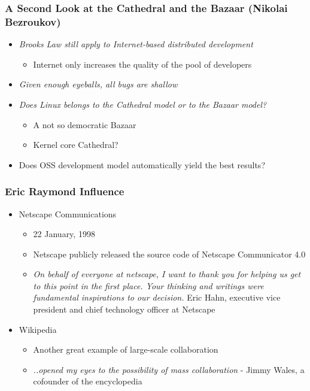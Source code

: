 \documentclass{beamer}
\begin{document}
\begin{frame}
\frametitle{A Second Look at the Cathedral and the Bazaar (Nikolai Bezroukov)}

\begin{itemize}

\item \emph{Brooks Law still apply to Internet-based distributed development}
	\begin{itemize}
	\item Internet only increases the quality of the pool of developers
	\end{itemize}

\item \emph{Given enough eyeballs, all bugs are shallow}
\item \emph{Does Linux belongs to the Cathedral model or to the Bazaar model?}
	\begin{itemize}
		\item A not so democratic Bazaar
		\item Kernel core Cathedral?
	\end{itemize}

\item Does OSS development model automatically yield the best results?

\end{itemize}

\end{frame}



\begin{frame}
\frametitle{Eric Raymond Influence}

\begin{itemize}

\item Netscape Communications
	\begin{itemize}
	\item 22 January, 1998
	\item Netscape publicly released the source code of Netscape Communicator 4.0
	\item \emph{On behalf of everyone at netscape, I want to thank you for helping us get to this point in the first place. Your thinking and writings were fundamental inspirations to our decision.} Eric Hahn, executive vice president and chief technology officer at Netscape
	\end{itemize}
	
\item Wikipedia
	\begin{itemize}
	\item Another great example of large-scale collaboration
	\item \emph{..opened my eyes to the possibility of mass collaboration} - Jimmy Wales, a cofounder of the encyclopedia
	\end{itemize}


\end{itemize}

\end{frame}
\end{document}

